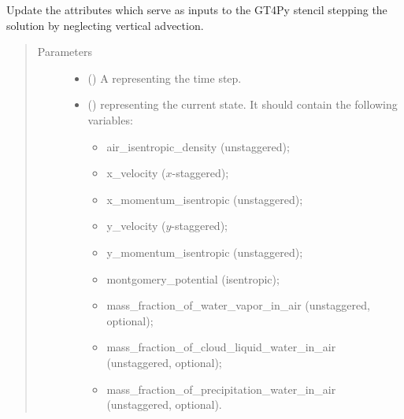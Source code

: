 \documentclass[letterpaper,10pt,english]{sphinxmanual}
\begin{document}
\begin{fulllineitems}
\begin{fulllineitems}
\label{\detokenize{api:tasmania.dycore.prognostic_isentropic_centered.PrognosticIsentropicCentered._stencils_stepping_by_neglecting_vertical_advection_set_inputs}}
Update the attributes which serve as inputs to the GT4Py stencil stepping the solution
by neglecting vertical advection.
\begin{quote}\begin{description}
\item[{Parameters}] \leavevmode\begin{itemize}
\item {} 
 () \textendash{} A  representing the time step.

\item {} 
 () \textendash{} 
{\hyperref[\detokenize{api:tasmania.storages.state_isentropic.StateIsentropic}]{}} representing the current state.
It should contain the following variables:
\begin{itemize}
\item {} 
air\_isentropic\_density (unstaggered);

\item {} 
x\_velocity (\(x\)-staggered);

\item {} 
x\_momentum\_isentropic (unstaggered);

\item {} 
y\_velocity (\(y\)-staggered);

\item {} 
y\_momentum\_isentropic (unstaggered);

\item {} 
montgomery\_potential (isentropic);

\item {} 
mass\_fraction\_of\_water\_vapor\_in\_air (unstaggered, optional);

\item {} 
mass\_fraction\_of\_cloud\_liquid\_water\_in\_air (unstaggered, optional);

\item {} 
mass\_fraction\_of\_precipitation\_water\_in\_air (unstaggered, optional).


\end{itemize}
\end{itemize}
\end{description}
\end{quote}
\end{fulllineitems}
\end{fulllineitems}
\end{document}
